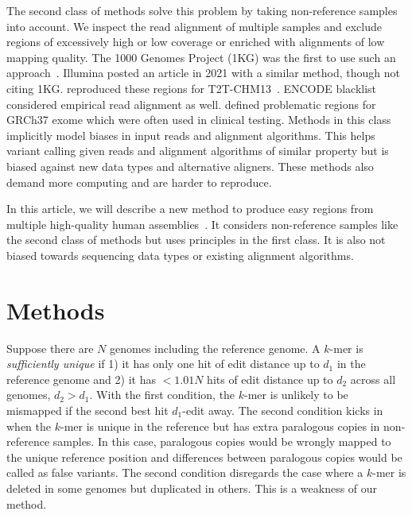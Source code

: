 \documentclass[webpdf,contemporary,large,namedate]{oup-authoring-template}%
\begin{document}
The second class of methods solve this problem by taking non-reference samples into account.
We inspect the read alignment of multiple samples and exclude regions of excessively high or low coverage or enriched with alignments of low mapping quality.
The 1000 Genomes Project (1KG) was the first to use such an approach~\citep{1000-Genomes-Project-Consortium:2010qc}.
Illumina posted an article in 2021 with a similar method, though not citing 1KG.
\citet{Aganezov:2022aa} reproduced these regions for T2T-CHM13~\citep{Nurk:2022up}.
ENCODE blacklist~\citep{Amemiya:2019aa} considered empirical read alignment as well.
\citet{Mandelker:2016aa} defined problematic regions for GRCh37 exome which were often used in clinical testing.
Methods in this class implicitly model biases in input reads and alignment algorithms.
This helps variant calling given reads and alignment algorithms of similar property
but is biased against new data types and alternative aligners.
These methods also demand more computing and are harder to reproduce.

In this article, we will describe a new method to produce easy regions from multiple high-quality human assemblies~\citep{Liao:2023aa}.
It considers non-reference samples like the second class of methods but uses principles in the first class.
It is also not biased towards sequencing data types or existing alignment algorithms.

\section{Methods}

Suppose there are $N$ genomes including the reference genome.
A $k$-mer is \emph{sufficiently unique}
if 1) it has only one hit of edit distance up to $d_1$ in the reference genome
and 2) it has $<1.01N$ hits of edit distance up to $d_2$ across all genomes, $d_2>d_1$.
With the first condition, the $k$-mer is unlikely to be mismapped if the second best hit $d_1$-edit away.
The second condition kicks in when the $k$-mer is unique in the reference but has extra paralogous copies in non-reference samples.
In this case, paralogous copies would be wrongly mapped to the unique reference position and
differences between paralogous copies would be called as false variants.
The second condition disregards the case where a $k$-mer is deleted in some genomes but duplicated in others.
This is a weakness of our method.
\end{document}
